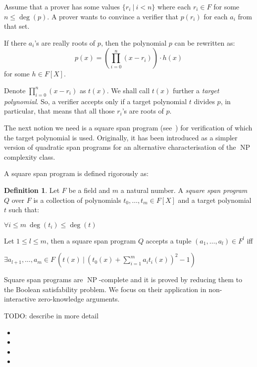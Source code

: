 \documentclass{article}
\theoremstyle{definition}
\newtheorem{definition}{Definition}[section]
\theoremstyle{remark}
\begin{document}
Assume that a prover has some values $\{ r_i \: | \: i < n\}$ where each $r_i \in F$ for some $n \leq \deg(p)$.
A prover wants to convince a verifier that $p(r_i)$ for each $a_i$ from that set.

If there $a_i$'s are really roots of $p$, then the polynomial $p$ can be rewritten as:
\begin{equation}
p(x) = \left( \prod_{i = 0}^n (x - r_i) \right) \cdot h(x)
\end{equation}
for some $h \in F[X]$.

Denote $\prod_{i = 0}^n (x - r_i)$ as $t(x)$. We shall call $t(x)$ further a \emph{target polynomial}. So, a verifier accepts only if a target polynomial $t$ divides $p$, in particular, that means that all those $r_i$'s are roots of $p$.

The next notion we need is a square span program (see~\cite{danezis2014square}) for verification of which the target polynomial is used. Originally, it has been introduced as a simpler version of quadratic span programs for an alternative characterisation of the $\operatorname{NP}$ complexity class.

A square span program is defined rigorously as:
\begin{definition}
Let $F$ be a field and $m$ a natural number. A \emph{square span program} $Q$ over $F$ is a collection of polynomials $t_0, \dots, t_m \in F[X]$ and a target polynomial $t$ such that:
\begin{center}
$\forall i \leq m \: \deg(t_i) \leq \deg(t)$
\end{center}

Let $1 \leq l \leq m$, then a square span program $Q$ accepts a tuple $(a_1, \dots, a_l) \in F^l$ iff

\begin{center}
$\exists a_{l + 1}, \dots, a_m \in F \: \left( t(x) \: | \: {\left( t_0(x) + \sum \limits_{i = 1}^m a_i t_i(x) \right)}^2 - 1 \right)$
\end{center}
\end{definition}

Square span programs are $\operatorname{NP}$-complete and it is proved by reducing them to the Boolean satisfability problem. We focus on their application in non-interactive zero-knowledge arguments.

TODO: describe in more detail

\begin{itemize}
\item
\item
\item
\item
\end{itemize}
\end{document}
